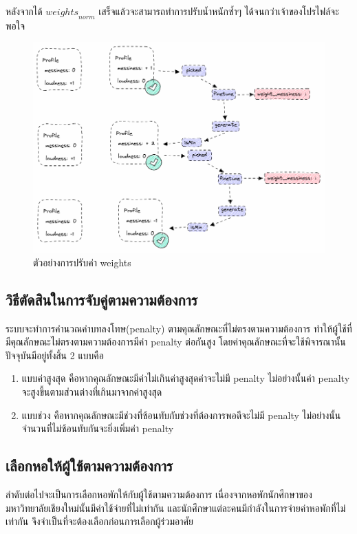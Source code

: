 หลังจากได้ $\mathit{weights}_\mathit{norm}$ เสร็จแล้วจะสามารถทำการปรับน้ำหนักซ้ำๆ ได้จนกว่าเจ้าของโปรไฟล์จะพอใจ
\begin{figure}[h]
  \begin{center}
    \includegraphics[width=\linewidth]{photo/diagram/finetune_flow.png}
  \end{center}
  \caption{ตัวอย่างการปรับค่า weights}
  \label{fig:finetune-flow}
\end{figure}

\subsection{วิธีตัดสินในการจับคู่ตามความต้องการ}
ระบบจะทำการคำนวณค่าบทลงโทษ(penalty) ตามคุณลักษณะที่ไม่ตรงตามความต้องการ ทำให้ผู้ใช้ที่มีคุณลักษณะไม่ตรงตามความต้องการมีค่า penalty ต่อกันสูง
โดยค่าคุณลักษณะที่จะใช้พิจารณานั้นปัจจุบันมีอยู่ทั้งสิ้น 2 แบบคือ
\begin{enumerate}
  \item แบบค่าสูงสุด คือหากคุณลักษณะมีค่าไม่เกินค่าสูงสุดค่าจะไม่มี penalty ไม่อย่างนั้นค่า penalty จะสูงขึ้นตามส่วนต่างที่เกินมาจากค่าสูงสุด
  \item แบบช่วง คือหากคุณลักษณะมีช่วงที่ซ้อนทับกับช่วงที่ต้องการพอดีจะไม่มี penalty ไม่อย่างนั้นจำนวนที่ไม่ซ้อนทับกันจะยิ่งเพิ่มค่า penalty
\end{enumerate}

\subsection{เลือกหอให้ผู้ใช้ตามความต้องการ}
ลำดับต่อไปจะเป็นการเลือกหอพักให้กับผู้ใช้ตามความต้องการ เนื่องจากหอพักนักศึกษาของมหาวิทยาลัยเชียงใหม่นั้นมีค่าใช้จ่ายที่ไม่เท่ากัน
และนักศึกษาแต่ละคนมีกำลังในการจ่ายค่าหอพักที่ไม่เท่ากัน จึงจำเป็นที่จะต้องเลือกก่อนการเลือกผู้ร่วมอาศัย 

